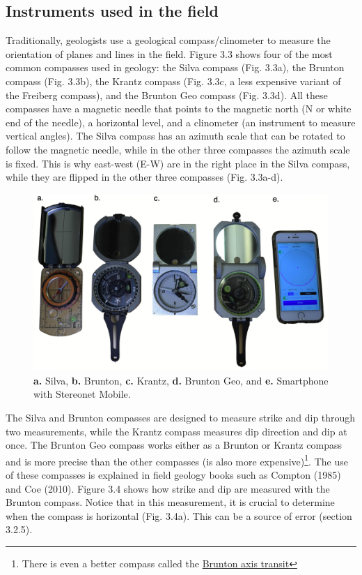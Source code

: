 \documentclass[a4paper , 12pt]{book}
\begin{document}
\subsection{Instruments used in the field}

Traditionally, geologists use a geological compass/clinometer to measure the orientation of planes and lines in the field. Figure 3.3 shows four of the most common compasses used in geology: the Silva compass (Fig. 3.3a), the Brunton compass (Fig. 3.3b), the Krantz compass (Fig. 3.3c, a less expensive variant of the Freiberg compass), and the Brunton Geo compass (Fig. 3.3d). All these compasses have a magnetic needle that points  to the magnetic north (N or white end of the needle), a horizontal level, and a clinometer (an instrument to measure vertical angles). The Silva compass has an azimuth scale that can be rotated to follow the magnetic needle, while in the other three compasses the azimuth scale is fixed. This is why east-west (E-W) are in the right place in the Silva compass, while they are flipped in the other three compasses (Fig. 3.3a-d).

\begin{figure}[ht]
    \centering
    \includegraphics[width=13cm]{ch3f3.pdf}
    \caption{\textbf{a.} Silva, \textbf{b.} Brunton, \textbf{c.} Krantz, \textbf{d.} Brunton Geo, and \textbf{e.} Smartphone with Stereonet Mobile.}
\end{figure}

The Silva and Brunton compasses are designed to measure strike and dip through two measurements, while the Krantz compass measures dip direction and dip at once. The Brunton Geo compass works either as a Brunton or Krantz compass and is more precise than the other compasses (is also more expensive)\footnote{There is even a better compass called the \href{http://www.realscienceinnovations.com/brunton-axis.html}{Brunton axis transit}}. The use of these compasses is explained in field geology books such as Compton (1985) and Coe (2010). Figure 3.4 shows how strike and dip are measured with the Brunton compass. Notice that in this measurement, it is crucial to determine when the compass is horizontal (Fig. 3.4a). This can be a source of error (section 3.2.5).
\end{document}
